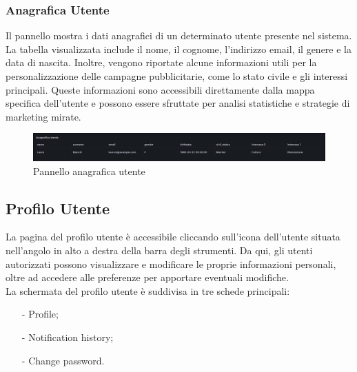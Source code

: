 \documentclass[10pt]{article}
\begin{document}
\begin{justify}
    \subsubsection{Anagrafica Utente}
    Il pannello mostra i dati anagrafici di un determinato utente presente nel sistema. La tabella visualizzata include il nome, il cognome, l'indirizzo email, il genere e la data di nascita. Inoltre, vengono riportate alcune informazioni utili per la personalizzazione delle campagne pubblicitarie, come lo stato civile e gli interessi principali. Queste informazioni sono accessibili direttamente dalla mappa specifica dell'utente e possono essere sfruttate per analisi statistiche e strategie di marketing mirate.  
    \begin{figure}[H]
    \centering
    \includegraphics[width=1\linewidth]{anagrafica.png}
    \caption{Pannello anagrafica utente}
    \end{figure}



\subsection{Profilo Utente}
La pagina del profilo utente è accessibile cliccando sull'icona dell'utente situata nell'angolo in alto a destra della barra degli strumenti. Da qui, gli utenti autorizzati possono visualizzare e modificare le proprie informazioni personali, oltre ad accedere alle preferenze per apportare eventuali modifiche.\\
La schermata del profilo utente è suddivisa in tre schede principali:  
\begin{itemize}  
    \item[-] Profile; 
    \item[-] Notification history; 
    \item[-] Change password.  
\end{itemize}
    

\end{justify}
\end{document}
